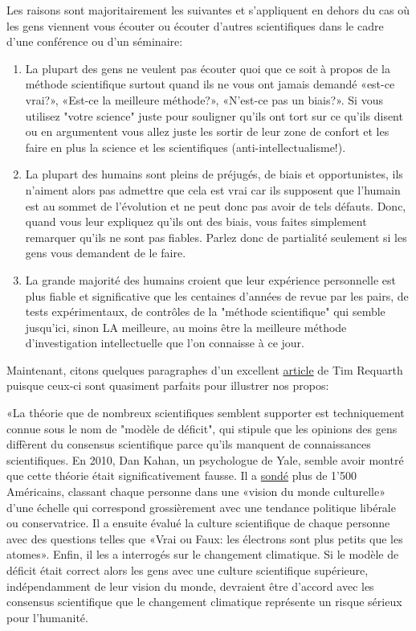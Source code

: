 	Les raisons sont majoritairement les suivantes et s'appliquent en dehors du cas où les gens viennent vous écouter ou écouter d'autres scientifiques dans le cadre d'une conférence ou d'un séminaire:
	\begin{enumerate}
		\item La plupart des gens ne veulent pas écouter quoi que ce soit à propos de la méthode scientifique surtout quand ils ne vous ont jamais demandé «est-ce vrai?», «Est-ce la meilleure méthode?», «N'est-ce pas un biais?». Si vous utilisez "votre science" juste pour souligner qu'ils ont tort sur ce qu'ils disent ou en argumentent vous allez juste les sortir de leur zone de confort et les faire en plus la science et les scientifiques (anti-intellectualisme!).
		
		\item La plupart des humains sont pleins de préjugés, de biais et opportunistes, ils n'aiment alors pas admettre que cela est vrai car ils supposent que l'humain est au sommet de l'évolution et ne peut donc pas avoir de tels défauts. Donc, quand vous leur expliquez qu'ils ont des biais, vous faites simplement remarquer qu'ils ne sont pas fiables. Parlez donc de partialité seulement si les gens vous demandent de le faire.
		
		\item La grande majorité des humains croient que leur expérience personnelle est plus fiable et significative que les centaines d'années de revue par les pairs, de tests expérimentaux, de contrôles de la "méthode scientifique" qui semble jusqu'ici, sinon LA meilleure, au moins être la meilleure méthode d'investigation intellectuelle que l'on connaisse à ce jour.
	\end{enumerate}
	Maintenant, citons quelques paragraphes d'un excellent \href{http://www.slate.com/articles/health_and_science/science/2017/04/explaining_science_won_t_fix_information_illiteracy.html}{{\color{blue} article}} de Tim Requarth puisque ceux-ci sont quasiment parfaits pour illustrer nos propos:
	
	«La théorie que de nombreux scientifiques semblent supporter est techniquement connue sous le nom de "modèle de déficit", qui stipule que les opinions des gens diffèrent du consensus scientifique parce qu'ils manquent de connaissances scientifiques. En 2010, Dan Kahan, un psychologue de Yale, semble avoir montré que cette théorie était significativement fausse. Il a \href{http://www.nature.com/nclimate/journal/v2/n10/full/nclimate1547.html}{{\color{blue} sondé}} plus de 1'500 Américains, classant chaque personne dans une «vision du monde culturelle» d'une échelle qui correspond grossièrement avec une tendance politique libérale ou conservatrice. Il a ensuite évalué la culture scientifique de chaque personne avec des questions telles que «Vrai ou Faux: les électrons sont plus petits que les atomes». Enfin, il les a interrogés sur le changement climatique. Si le modèle de déficit était correct alors les gens avec une culture scientifique supérieure, indépendamment de leur vision du monde, devraient être d'accord avec les consensus scientifique que le changement climatique représente un risque sérieux pour l'humanité.
  
